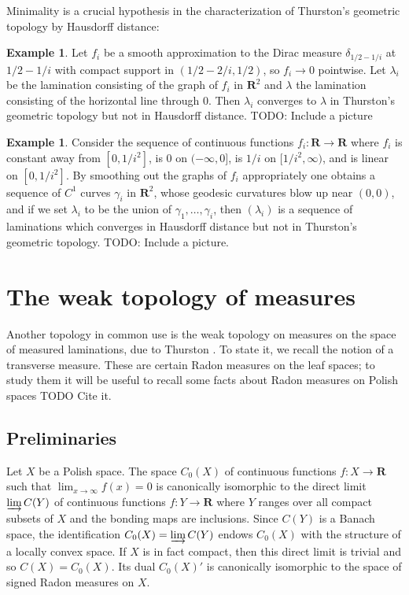 \documentclass[reqno,10pt]{amsart}
\newcommand{\RR}{\mathbf{R}}
\theoremstyle{definition}
\newtheorem{example}[theorem]{Example}
\numberwithin{equation}{section}
\begin{document}
Minimality is a crucial hypothesis in the characterization of Thurston's geometric topology by Hausdorff distance:

\begin{example}
Let $f_i$ be a smooth approximation to the Dirac measure $\delta_{1/2-1/i}$ at $1/2 - 1/i$ with compact support in $(1/2 - 2/i, 1/2)$, so $f_i \to 0$ pointwise.
Let $\lambda_i$ be the lamination consisting of the graph of $f_i$ in $\RR^2$ and $\lambda$ the lamination consisting of the horizontal line through $0$.
Then $\lambda_i$ converges to $\lambda$ in Thurston's geometric topology but not in Hausdorff distance.
TODO: Include a picture
\end{example}

\begin{example}\label{Hausdorff does not imply Thurston}
Consider the sequence of continuous functions $f_i: \RR \to \RR$ where $f_i$ is constant away from $[0, 1/i^2]$, is $0$ on $(-\infty, 0]$, is $1/i$ on $[1/i^2, \infty)$, and is linear on $[0, 1/i^2]$.
By smoothing out the graphs of $f_i$ appropriately one obtains a sequence of $C^1$ curves $\gamma_i$ in $\RR^2$, whose geodesic curvatures blow up near $(0, 0)$, and if we set $\lambda_i$ to be the union of $\gamma_1, \dots, \gamma_i$, then $(\lambda_i)$ is a sequence of laminations which converges in Hausdorff distance but not in Thurston's geometric topology.
TODO: Include a picture.
\end{example}


\section{The weak topology of measures}
Another topology in common use is the weak topology on measures on the space of measured laminations, due to Thurston \cite[Chapter 8]{thurston1998minimal}.
To state it, we recall the notion of a transverse measure.
These are certain Radon measures on the leaf spaces; to study them it will be useful to recall some facts about Radon measures on Polish spaces TODO Cite it.

\subsection{Preliminaries}
Let $X$ be a Polish space.
The space $C_0(X)$ of continuous functions $f: X \to \RR$ such that $\lim_{x \to \infty} f(x) = 0$ is canonically isomorphic to the direct limit $\varinjlim C(Y)$ of continuous functions $f: Y \to \RR$ where $Y$ ranges over all compact subsets of $X$ and the bonding maps are inclusions.
Since $C(Y)$ is a Banach space, the identification $C_0(X) = \varinjlim C(Y)$ endows $C_0(X)$ with the structure of a locally convex space.
If $X$ is in fact compact, then this direct limit is trivial and so $C(X) = C_0(X)$.
Its dual $C_0(X)'$ is canonically isomorphic to the space of signed Radon measures on $X$.
\end{document}
